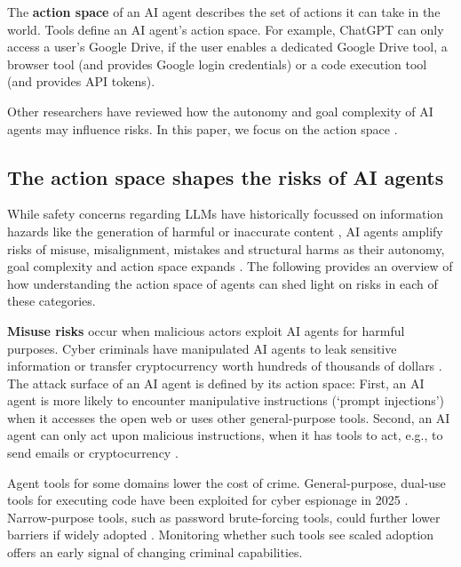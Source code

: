 \documentclass[manuscript,screen,nonacm,oneside]{acmart}
\begin{document}
The \textbf{action space} of an AI agent describes the set of actions it can take in the world. Tools define an AI agent's action space. For example, ChatGPT can only access a user's Google Drive, if the user enables a dedicated Google Drive tool, a browser tool (and provides Google login credentials) or a code execution tool (and provides API tokens).

Other researchers have reviewed how the autonomy \citep{cihon2024chilling} and goal complexity \citep{chan2023harms} of AI agents may influence risks. In this paper, we focus on the action space \citep{imda}. 

\subsection{The action space shapes the risks of AI agents}

While safety concerns regarding LLMs have historically focussed on information hazards like the generation of harmful or inaccurate content \citep{bommasani2021opportunities}, AI agents amplify risks of misuse, misalignment, mistakes and structural harms as their autonomy, goal complexity and action space expands \citep{shah2025approach, bengio2025superintelligent}. The following provides an overview of how understanding the action space of agents can shed light on risks in each of these categories.

\textbf{Misuse risks} occur when malicious actors exploit AI agents for harmful purposes. Cyber criminals have manipulated AI agents to leak sensitive information or transfer cryptocurrency worth hundreds of thousands of dollars \citep{reddy2025echoleakrealworldzeroclickprompt, decryptAiXBTToken, akinciborgHackingCrypto, deng2025ai}. The attack surface of an AI agent is defined by its action space: First, an AI agent is more likely to encounter manipulative instructions (`prompt injections') when it accesses the open web or uses other general-purpose tools. Second, an AI agent can only act upon malicious instructions, when it has tools to act, e.g., to send emails or cryptocurrency \citep{mo2025attractive, hou2025modelcontextprotocolmcp, gan2024navigating}. 

Agent tools for some domains lower the cost of crime. General-purpose, dual-use tools for executing code have been exploited for cyber espionage in 2025 \citep{anthropicDisruptingFirst}. Narrow-purpose tools, such as password brute-forcing tools, could further lower barriers if widely adopted \citep{ncscImpactCyber}. Monitoring whether such tools see scaled adoption offers an early signal of changing criminal capabilities.
\end{document}
